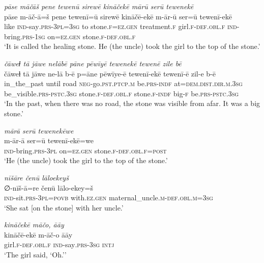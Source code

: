 \ea \label{ZP.52}
\textit{pāse māčāš pene tewenū sirewē kināčekē mārū serū tewenekē} \\ 
\gll pāse m-āč-ā=š pene tewenī=ū sirewē kināčē-ekē m-ār-ū ser=ū tewenī-ekē \\ 
 like \textsc{ind-}say\textsc{.prs}\textsc{-3pl}\textsc{=3sg} to stone\textsc{.f}\textsc{\textsc{=ez.gen}} treatment\textsc{.f} girl\textsc{.f}\textsc{-def}\textsc{.obl}\textsc{.f} \textsc{ind-}bring\textsc{.prs}\textsc{-\textsc{1sg}} on\textsc{\textsc{=ez.gen}} stone\textsc{.f}\textsc{-def}\textsc{.obl}\textsc{.f} \\ 
\glt `It is called the healing stone. He (the uncle) took the girl to the top of the stone.'
\z 
 
\ea \label{ZP.54}
\textit{čāweɫ tā jāwe nelābē pāne pēwīyē tewenekē tewenē zile bē} \\ 
\gll čāweɫ tā jāwe ne-lā b-ē p=āne pēwīye-ē tewenī-ekē tewenī-ē zil-e b-ē \\ 
 in\_the\_past until road \textsc{neg-}go\textsc{.pst}\textsc{.ptcp}\textsc{.m} be\textsc{.prs}\textsc{-indf} at=\textsc{dem.dist}\textsc{.dir}\textsc{.m}\textsc{.3sg} be\_visible\textsc{.prs}\textsc{-pstc}\textsc{.3sg} stone\textsc{.f}\textsc{-def}\textsc{.obl}\textsc{.f} stone\textsc{.f}\textsc{-indf} big\textsc{-f} be\textsc{.prs}\textsc{-pstc}\textsc{.3sg} \\ 
\glt `In the past, when there was no road, the stone was visible from afar. It was a big stone.'
\z 
 
\ea \label{ZP.55}
\textit{mārā serū tewenekēwe} \\ 
\gll m-ār-ā ser=ū tewenī-ekē=we \\ 
 \textsc{ind-}bring\textsc{.prs}\textsc{-3pl} on\textsc{\textsc{=ez.gen}} stone\textsc{.f}\textsc{-def}\textsc{.obl}\textsc{.f}\textsc{=\textsc{post}} \\ 
\glt `He (the uncle) took the girl to the top of the stone.'
\z 
 
\ea \label{ZP.56}
\textit{nīšāre čenū lāloekeyš} \\ 
\gll ∅-nīš-ā=re čenū lālo-ekey=š \\ 
 \textsc{ind-}sit\textsc{.prs}\textsc{-3pl}\textsc{=\textsc{povb}} with\textsc{.ez.gen} maternal\_uncle\textsc{.m}\textsc{-def}\textsc{.obl}\textsc{.m}\textsc{=3sg} \\ 
\glt `She sat [on the stone] with her uncle.'
\z 
 
\ea \label{ZP.57}
\textit{kināčekē māčo, āāy} \\ 
\gll kināčē-ekē m-āč-o āāy \\ 
 girl\textsc{.f}\textsc{-def}\textsc{.obl}\textsc{.f} \textsc{ind-}say\textsc{.prs}\textsc{-3sg} \textsc{intj} \\ 
\glt `The girl said, ‘Oh.’'
\z 
 
